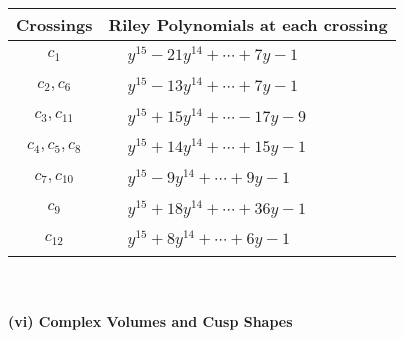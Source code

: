 \documentclass[1p]{elsarticle_modified}
\theoremstyle{definition}
\begin{document}
\begin{tabular}{m{50pt}|m{274pt}}
Crossings & \hspace{64pt}Riley Polynomials at each crossing \\
\hline $$\begin{aligned}c_{1}\end{aligned}$$&$\begin{aligned}
&y^{15}-21 y^{14}+\cdots+7 y-1
\end{aligned}$\\
\hline $$\begin{aligned}c_{2},c_{6}\end{aligned}$$&$\begin{aligned}
&y^{15}-13 y^{14}+\cdots+7 y-1
\end{aligned}$\\
\hline $$\begin{aligned}c_{3},c_{11}\end{aligned}$$&$\begin{aligned}
&y^{15}+15 y^{14}+\cdots-17 y-9
\end{aligned}$\\
\hline $$\begin{aligned}c_{4},c_{5},c_{8}\end{aligned}$$&$\begin{aligned}
&y^{15}+14 y^{14}+\cdots+15 y-1
\end{aligned}$\\
\hline $$\begin{aligned}c_{7},c_{10}\end{aligned}$$&$\begin{aligned}
&y^{15}-9 y^{14}+\cdots+9 y-1
\end{aligned}$\\
\hline $$\begin{aligned}c_{9}\end{aligned}$$&$\begin{aligned}
&y^{15}+18 y^{14}+\cdots+36 y-1
\end{aligned}$\\
\hline $$\begin{aligned}c_{12}\end{aligned}$$&$\begin{aligned}
&y^{15}+8 y^{14}+\cdots+6 y-1
\end{aligned}$\\
\hline
\end{tabular}\\~\\
\newpage\flushleft \textbf{(vi) Complex Volumes and Cusp Shapes}
\end{document}
